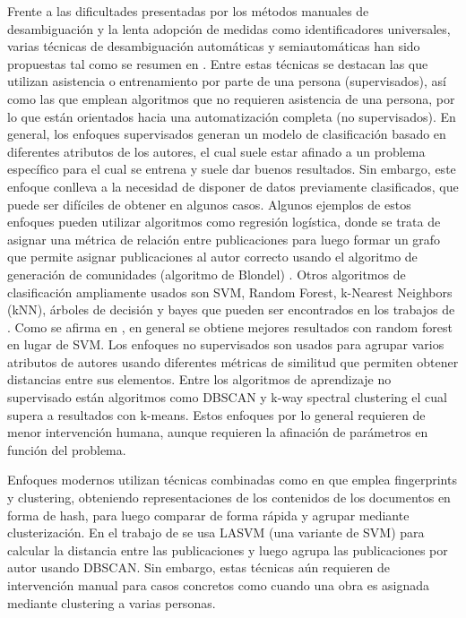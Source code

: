 \documentclass[conference]{IEEEtran}
\begin{document}
Frente a las dificultades presentadas por los métodos manuales de desambiguación y la lenta adopción de medidas como identificadores universales, varias técnicas de desambiguación automáticas y semiautomáticas  han sido propuestas tal como se resumen en \cite{journals/sigmod/FerreiraGL12}\cite{Smalheiser:2009:AND:1951529.1951542}. Entre estas técnicas se destacan las que utilizan asistencia o entrenamiento  por parte de una persona (supervisados), así como las que emplean algoritmos que no requieren asistencia de una persona, por lo que están orientados hacia una automatización completa (no supervisados). En general, los enfoques supervisados generan un modelo de clasificación basado en diferentes atributos de los autores, el cual suele estar afinado a un problema específico para el cual se entrena y suele dar buenos resultados. Sin embargo, este enfoque conlleva a la necesidad de disponer de datos previamente clasificados, que puede ser difíciles de obtener en algunos casos. Algunos ejemplos de estos enfoques pueden utilizar algoritmos como regresión logística, donde se trata de asignar una métrica de relación entre publicaciones para luego formar un grafo que permite asignar publicaciones al autor correcto usando el algoritmo de generación de comunidades (algoritmo de Blondel) \cite{gurney2012author}. Otros algoritmos de clasificación ampliamente usados son SVM, Random Forest, k-Nearest Neighbors (kNN), árboles de decisión y bayes que pueden ser encontrados en los trabajos de \cite{treeratpituk2009disambiguating}\cite{huynh2013vietnamese}\cite{yang2008author}\cite{han2005hierarchical}. Como se afirma en \cite{treeratpituk2009disambiguating}, en  general se obtiene mejores resultados con random forest en lugar de SVM. Los enfoques no supervisados son usados para agrupar varios atributos de autores usando diferentes métricas de similitud que permiten obtener distancias entre sus elementos. Entre los algoritmos de aprendizaje no supervisado están algoritmos como DBSCAN\cite{huang2006efficient} y k-way spectral clustering \cite{giles2005name} el cual supera a resultados con k-means. Estos enfoques por lo general requieren de menor intervención humana, aunque requieren la afinación de parámetros en función del problema.

Enfoques modernos utilizan técnicas combinadas como en \cite{hansemantic} que emplea fingerprints y clustering, obteniendo representaciones de los contenidos de los documentos en forma de hash, para luego comparar de forma rápida y agrupar mediante clusterización. En el trabajo de \cite{huang2006efficient} se usa LASVM (una variante de SVM) para calcular la distancia entre las publicaciones y luego agrupa las publicaciones por autor usando DBSCAN. Sin embargo, estas técnicas aún requieren de intervención manual para casos concretos como cuando una obra es asignada mediante clustering a varias personas.
\end{document}
